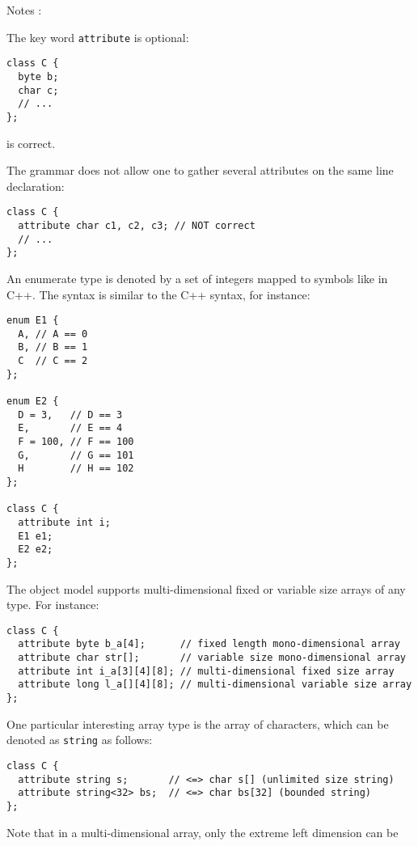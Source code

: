 Notes :
\be
\vspace{-0.2cm}
\item The key word \texttt{attribute} is optional:
\vspace{-0.2cm}
\begin{verbatim}
class C {
  byte b;
  char c;
  // ...
};
\end{verbatim}
\vspace{-0.2cm}
is correct.
\item The grammar does not allow one to gather several attributes on
the same line declaration:
\vspace{-0.2cm}
\begin{verbatim}
class C {
  attribute char c1, c2, c3; // NOT correct
  // ...
};
\end{verbatim}
\ee
{}
An enumerate type is denoted by a set of integers mapped to symbols
like in C++.
The syntax is similar to the C++ syntax, for instance:
\vspace{-0.2cm}
\begin{verbatim}
enum E1 {
  A, // A == 0
  B, // B == 1
  C  // C == 2
};

enum E2 {
  D = 3,   // D == 3
  E,       // E == 4
  F = 100, // F == 100
  G,       // G == 101
  H        // H == 102
};

class C {
  attribute int i;
  E1 e1;
  E2 e2;
};
\end{verbatim}
The object model supports multi-dimensional fixed or variable size arrays
of any type. For instance:
\vspace{-0.2cm}
\begin{verbatim}
class C {
  attribute byte b_a[4];      // fixed length mono-dimensional array
  attribute char str[];       // variable size mono-dimensional array
  attribute int i_a[3][4][8]; // multi-dimensional fixed size array
  attribute long l_a[][4][8]; // multi-dimensional variable size array
};
\end{verbatim}
One particular interesting array type is the array of characters, which
can be denoted as \texttt{string} as follows:
\vspace{-0.2cm}
\begin{verbatim}
class C {
  attribute string s;       // <=> char s[] (unlimited size string)
  attribute string<32> bs;  // <=> char bs[32] (bounded string)
};
\end{verbatim}
Note that in a multi-dimensional array, only the extreme left dimension can be
